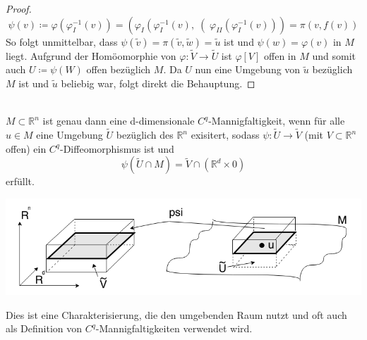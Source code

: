 \begin{proof}
\begin{equation*}
\psi (v) \coloneqq \varphi \left(\varphi_I ^{-1} (v) \right) =
\left( \varphi_I \left(\varphi_I ^{-1} (v),\right( 
\varphi_{II} \left(\varphi_I ^ {-1} (v) \right) \right) = \pi \left(v, f(v)\right)
\end{equation*}
\linebreak
So folgt unmittelbar, dass $\psi (\tilde{v}) = \pi (\tilde{v}, \tilde{w}) = \tilde{u}$ ist und $\psi (w) = \varphi (v)$ in $M$ liegt. Aufgrund der Homöomorphie von $\varphi : \tilde{V} \rightarrow \tilde{U} $ ist $\varphi[V]$ offen in $M$ und somit auch $U\coloneqq\psi(W)$ offen bezüglich $M$. Da $U$ nun eine Umgebung von $\tilde{u}$ bezüglich $M$ ist und $\tilde{u}$ beliebig war, folgt direkt die Behauptung.
\end{proof}

\begin{satz}
\mbox{} \\
$M \subset \mathbb{R}^{n}$ ist genau dann eine d-dimensionale $C^{q}$-Mannigfaltigkeit, wenn für alle $u\in M$ eine Umgebung $\tilde{U}$ bezüglich des $\mathbb{R}^n$ exisitert, sodass $\psi:\tilde{U}\rightarrow\tilde{V}$ (mit $V\subset\mathbb{R}^n$ offen) ein $C^q$-Diffeomorphismus ist und
    \begin{equation*}
    \psi \left( \tilde{U} \cap M \right) =
    \tilde{V} \cap \left( \mathbb{R}^d \times {0} \right) 
    \end{equation*}
erfüllt.
\begin{center}
\includegraphics[scale=0.5]{pictures/MA2_0011}\\
\end{center}
\end{satz}

Dies ist eine Charakterisierung, die den umgebenden Raum nutzt und oft auch als Definition von $C^q$-Mannigfaltigkeiten verwendet wird.
    

